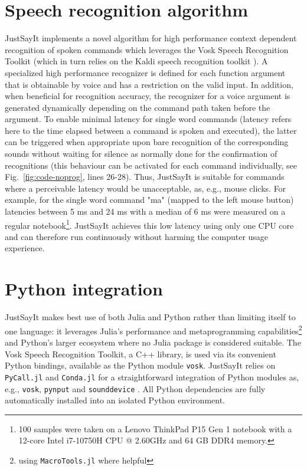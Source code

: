 \documentclass{juliacon}
\begin{document}
\section{Speech recognition algorithm}
JustSayIt implements a novel algorithm for high performance context dependent recognition of spoken commands which leverages the Vosk Speech Recognition Toolkit \cite{vosk} (which in turn relies on the Kaldi speech recognition toolkit \cite{povey2011kaldi}). A specialized high performance recognizer is defined for each function argument that is obtainable by voice and has a restriction on the valid input. In addition, when beneficial for recognition accuracy, the recognizer for a voice argument is generated dynamically depending on the command path taken before the argument. To enable minimal latency for single word commands (latency refers here to the time elapsed between a command is spoken and executed), the latter can be triggered when appropriate upon bare recognition of the corresponding sounds without waiting for silence as normally done for the confirmation of recognitions (this behaviour can be activated for each command individually, see Fig.~\ref{fig:code-noprog}, lines 26-28). Thus, JustSayIt is suitable for commands where a perceivable latency would be unacceptable, as, e.g., mouse clicks. For example, for the single word command "ma" (mapped to the left mouse button) latencies between 5 ms and 24 ms with a median of 6 ms were measured on a regular notebook\footnote{100 samples were taken on a Lenovo ThinkPad P15 Gen 1 notebook with a 12-core Intel i7-10750H CPU @ 2.60GHz and 64 GB DDR4 memory.}. JustSayIt achieves this low latency using only one CPU core and can therefore run continuously without harming the computer usage experience.

\section{Python integration}
JustSayIt makes best use of both Julia and Python rather than limiting itself to one language: it leverages Julia's performance and metaprogramming capabilities\footnote{using \texttt{MacroTools.jl} \cite{macrotools_jl} where helpful} and Python's larger ecosystem where no Julia package is considered suitable. The Vosk Speech Recognition Toolkit, a C++ library, is used via its convenient Python bindings, available as the Python module \texttt{vosk}. JustSayIt relies on \texttt{PyCall.jl} \cite{pycall_jl} and \texttt{Conda.jl} \cite{conda_jl} for a straightforward integration of Python modules as, e.g., \texttt{vosk}, \texttt{pynput} \cite{pynput} and \texttt{sounddevice} \cite{sounddevice}. All Python dependencies are fully automatically installed into an isolated Python environment.
\end{document}
